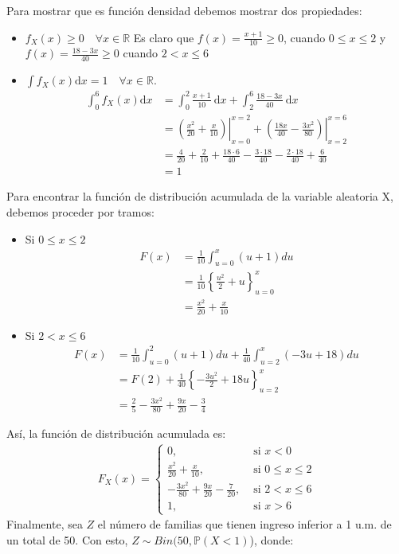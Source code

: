 \begin{solution}
    Para mostrar que es función densidad debemos mostrar dos propiedades:
\begin{itemize}
    \item $f_X(x) \geq 0 \quad \forall x \in \mathbb{R}$
Es claro que $f(x)=\frac{x+1}{10} \geq 0$, cuando $0 \leq x \leq 2$ y $f(x)=\frac{18-3 x}{40} \geq 0$ cuando $2<x \leq 6$
    \item $\int f_X(x) \mathrm{d} x=1 \quad \forall x \in \mathbb{R}$.
    \begin{align*}
        \int_0^6 f_X(x) \mathrm{d} x & =\int_0^2 \frac{x+1}{10} \mathrm{~d} x+\int_2^6 \frac{18-3 x}{40} \mathrm{~d} x \\
        & =\left.\left(\frac{x^2}{20}+\frac{x}{10}\right)\right|_{x=0} ^{x=2}+\left.\left(\frac{18 x}{40}-\frac{3 x^2}{80}\right)\right|_{x=2} ^{x=6} \\
        & =\frac{4}{20}+\frac{2}{10}+\frac{18 \cdot 6}{40}-\frac{3 \cdot 18}{40}-\frac{2 \cdot 18}{40}+\frac{6}{40} \\
        & =1
    \end{align*}
\end{itemize}

Para encontrar la función de distribución acumulada de la variable aleatoria X, debemos proceder por tramos:
\begin{itemize}
    \item Si $0 \leq x \leq 2$
    \begin{align*}
        F(x) & =\frac{1}{10} \int_{u=0}^x(u+1) d u \\
        & =\frac{1}{10}\left\{\frac{u^2}{2}+u\right\}_{u=0}^x \\
        & =\frac{x^2}{20}+\frac{x}{10}
    \end{align*}
    \item Si $2<x \leq 6$
    \begin{align*}
        F(x) & =\frac{1}{10} \int_{u=0}^2(u+1) d u+\frac{1}{40} \int_{u=2}^x(-3 u+18) d u \\
        & =F(2)+\frac{1}{40}\left\{-\frac{3 u^2}{2}+18 u\right\}_{u=2}^x \\
        & =\frac{2}{5}-\frac{3 x^2}{80}+\frac{9 x}{20}-\frac{3}{4}
    \end{align*}
\end{itemize}
Así, la función de distribución acumulada es:
\begin{align*}
    F_X(x)=\left\{\begin{aligned}
        0, & \text { si } x<0 \\
        \frac{x^2}{20}+\frac{x}{10}, & \text { si } 0 \leq x \leq 2 \\
        -\frac{3 x^2}{80}+\frac{9 x}{20}-\frac{7}{20}, & \text { si } 2<x \leq 6 \\
        1, & \text { si } x>6
    \end{aligned}\right.
\end{align*}
Finalmente, sea $Z$ el número de familias que tienen ingreso inferior a 1 u.m. de un total de 50. Con esto, $Z\sim Bin(50,\mathbb{P}(X<1)$), donde:


\end{solution}
